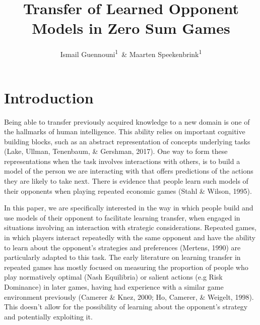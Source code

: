 \documentclass[man,floatsintext]{apa6}
\affiliation{
\vspace{0.5cm}
\textsuperscript{1} Department of Experimental Psychology, University College London}
\title{Transfer of Learned Opponent Models in Zero Sum Games}
\author{Ismail Guennouni\textsuperscript{1}~\& Maarten Speekenbrink\textsuperscript{1}}
\date{}
\begin{document}
\maketitle

\hypertarget{introduction}{%
\section{Introduction}\label{introduction}}

Being able to transfer previously acquired knowledge to a new domain is one of the hallmarks of human intelligence. This ability relies on important cognitive building blocks, such as an abstract representation of concepts underlying tasks (Lake, Ullman, Tenenbaum, \& Gershman, 2017). One way to form these representations when the task involves interactions with others, is to build a model of the person we are interacting with that offers predictions of the actions they are likely to take next. There is evidence that people learn such models of their opponents when playing repeated economic games (Stahl \& Wilson, 1995).

In this paper, we are specifically interested in the way in which people build and use models of their opponent to facilitate learning transfer, when engaged in situations involving an interaction with strategic considerations. Repeated games, in which players interact repeatedly with the same opponent and have the ability to learn about the opponent's strategies and preferences (Mertens, 1990) are particularly adapted to this task. The early literature on learning transfer in repeated games has mostly focused on measuring the proportion of people who play normatively optimal (Nash Equilibria) or salient actions (e.g Risk Dominance) in later games, having had experience with a similar game environment previously (Camerer \& Knez, 2000; Ho, Camerer, \& Weigelt, 1998). This doesn't allow for the possibility of learning about the opponent's strategy and potentially exploiting it.
\end{document}

